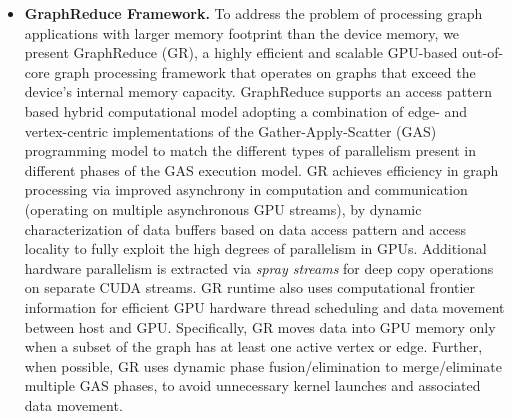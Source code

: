\begin{itemize}

\item \textbf{GraphReduce Framework.} To address the problem of processing graph applications with larger memory footprint than the device memory, we present GraphReduce (GR), a highly efficient and scalable GPU-based  out-of-core graph processing framework that operates on graphs that exceed the device’s internal memory capacity. GraphReduce supports an access pattern based hybrid computational model adopting a combination of edge- and vertex-centric implementations of the Gather-Apply-Scatter (GAS) programming model to match the different types of parallelism present in different phases of the GAS execution model. GR achieves efficiency in graph processing via improved asynchrony in computation and communication (operating on multiple asynchronous GPU streams), by dynamic characterization of data buffers based on data access pattern and access locality to fully exploit the high degrees of parallelism in GPUs.   Additional hardware parallelism is extracted via \textit{spray streams} for deep copy operations on separate CUDA streams. GR runtime also uses computational frontier information for efficient GPU hardware thread scheduling and data movement between host and GPU. Specifically, GR moves data into GPU memory only when a subset of the graph has at least one active vertex or edge. Further, when possible, GR uses dynamic phase fusion/elimination to merge/eliminate multiple GAS phases, to avoid unnecessary kernel launches and associated data movement.


\end{itemize}
